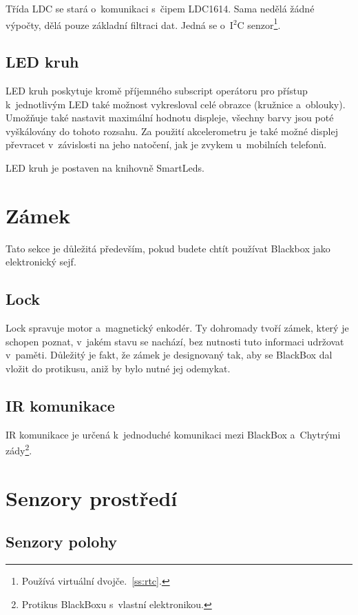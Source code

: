 Třída LDC se stará o~komunikaci s~čipem LDC1614.
Sama nedělá žádné výpočty, dělá pouze základní filtraci dat.
Jedná se o~I$^2$C senzor\footnote{Používá virtuální dvojče.~\autoref{ss:rtc}.}.

\subsection{LED kruh}

LED kruh poskytuje kromě příjemného subscript operátoru pro přístup k~jednotlivým LED také možnost vykresloval celé obrazce (kružnice a~oblouky).
Umožňuje také nastavit maximální hodnotu displeje, všechny barvy jsou poté vyškálovány do tohoto rozsahu.
Za použití akcelerometru je také možné displej převracet v~závislosti na jeho natočení, jak je zvykem u~mobilních telefonů.

LED kruh je postaven na knihovně SmartLeds\cite{SmartLeds}.

\section{Zámek}

Tato sekce je důležitá především, pokud budete chtít používat Blackbox jako elektronický sejf.

\subsection{Lock}

Lock spravuje motor a~magnetický enkodér.
Ty dohromady tvoří zámek, který je schopen poznat, v~jakém stavu se nachází, bez nutnosti tuto informaci udržovat v~paměti.
Důležitý je fakt, že zámek je designovaný tak, aby se BlackBox dal vložit do protikusu, aniž by bylo nutné jej odemykat.

\subsection{IR komunikace}

IR komunikace je určená k~jednoduché komunikaci mezi BlackBox a~Chytrými zády\footnote{Protikus BlackBoxu s~vlastní elektronikou.}.


\section{Senzory prostředí}

\subsection{Senzory polohy}

